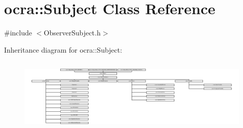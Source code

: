 \hypertarget{classocra_1_1Subject}{}\section{ocra\+:\+:Subject Class Reference}
\label{classocra_1_1Subject}


{\ttfamily \#include $<$Observer\+Subject.\+h$>$}

Inheritance diagram for ocra\+:\+:Subject\+:\begin{figure}[H]
\begin{center}
\leavevmode
\includegraphics[height=3.603604cm]{dc/d77/classocra_1_1Subject}
\end{center}
\end{figure}
